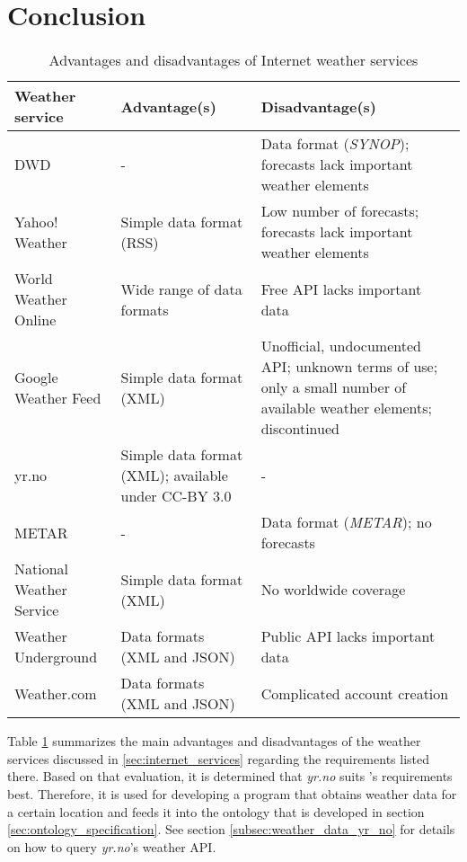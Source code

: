 \section{Conclusion}
\label{sec:weather_conclusion}

\begin{table}
  \begin{tabularx}{\textwidth}{|X|X|X|}
  \hline
  \textbf{Weather service} & \textbf{Advantage(s)} & \textbf{Disadvantage(s)} \\
  \hline \hline
  DWD & - & Data format (\emph{SYNOP}); forecasts lack important weather elements \\
  \hline
  Yahoo! Weather & Simple data format (RSS) & Low number of forecasts; forecasts lack important weather elements \\
  \hline
  World Weather Online & Wide range of data formats & Free API lacks important data \\
  \hline
  Google Weather Feed & Simple data format (XML) & Unofficial, undocumented API; unknown terms of use; only a small number of available weather elements; discontinued \\
  \hline
  yr.no & Simple data format (XML); available under CC-BY 3.0 & - \\
  \hline
  METAR & - & Data format (\emph{METAR}); no forecasts \\
  \hline
  National Weather Service & Simple data format (XML) & No worldwide coverage \\
  \hline
  Weather Underground & Data formats (XML and JSON) & Public API lacks important data \\
  \hline
  Weather.com & Data formats (XML and JSON) & Complicated account creation \\
  \hline
  \end{tabularx}
  \caption{Advantages and disadvantages of Internet weather services}
  \label{table:weather_services}
\end{table}

Table \ref{table:weather_services} summarizes the main advantages and disadvantages of the weather services discussed in \ref{sec:internet_services} regarding the requirements listed there. Based on that evaluation, it is determined that \emph{yr.no} suits \thinkhome's requirements best. Therefore, it is used for developing a program that obtains weather data for a certain location and feeds it into the \thinkhomeweather ontology that is developed in section \ref{sec:ontology_specification}. See section \ref{subsec:weather_data_yr_no} for details on how to query \emph{yr.no}'s weather API.

